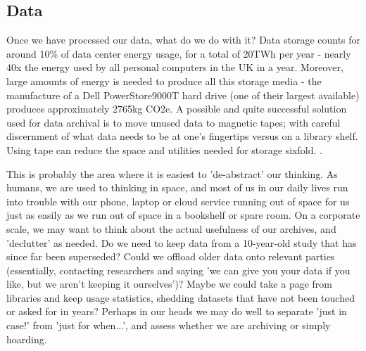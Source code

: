 \documentclass{article}
\begin{document}
\subsection{Data}
Once we have processed our data, what do we do with it? Data storage counts for around 10\% of data center energy usage, for a total of 20TWh per year \citep{shehabi2016united} - nearly 40x the energy used by all personal computers in the UK in a year.  \citep{waters2019energy} Moreover, large amounts of energy is needed to produce all this storage media - the manufacture of a Dell PowerStore9000T hard drive (one of their largest available) produces approximately 2765kg CO2e. \citep{dell2021powerstore} A possible and quite successful solution used for data archival is to move unused data to magnetic tapes; with careful discernment of what data needs to be at one's fingertips versus on a library shelf. Using tape can reduce the space and utilities needed for storage sixfold. \citep{moore2007disk}. \newline

This is probably the area where it is easiest to 'de-abstract' our thinking. As humans, we are used to thinking in space, and most of us in our daily lives run into trouble with our phone, laptop or cloud service running out of space for us just as easily as we run out of space in a bookshelf or spare room. On a corporate scale, we may want to think about the actual usefulness of our archives, and 'declutter' as needed. Do we need to keep data from a 10-year-old study that has since far been superseded? Could we offload older data onto relevant parties (essentially, contacting researchers and saying 'we can give you your data if you like, but we aren't keeping it ourselves')? Maybe we could take a page from libraries and keep usage statistics, shedding datasets that have not been touched or asked for in years? Perhaps in our heads we may do well to separate 'just in case!' from 'just for when...', and assess whether we are archiving or simply hoarding.
\end{document}
